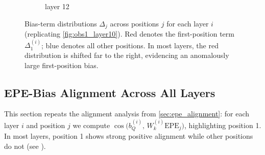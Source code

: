 \documentclass[11pt]{article}
\begin{document}
\begin{figure}[t]
\begin{subfigure}[t]{0.24\textwidth}
    \caption{layer 12}
  \end{subfigure}\hfill
  \vspace{2mm}
  \caption{Bias-term distributions $\Delta_j$ across positions $j$ for each layer $i$ (replicating \cref{fig:obs1_layer10}). Red denotes the first-position term $\Delta_1^{(i)}$; blue denotes all other positions. In most layers, the red distribution is shifted far to the right, evidencing an anomalously large first-position bias.}
  \label{fig:appendix_obs1_all_layers}
\end{figure}

\subsection{EPE-Bias Alignment Across All Layers}\label{app:epe_bias}

This section repeats the alignment analysis from \cref{sec:epe_alignment}: for each layer $i$ and position $j$ we compute $\cos\big(b_Q^{(i)},\, W_k^{(i)}\mathrm{EPE}_j\big)$, highlighting position 1. In most layers, position 1 shows strong positive alignment while other positions do not (see ).
\end{document}
